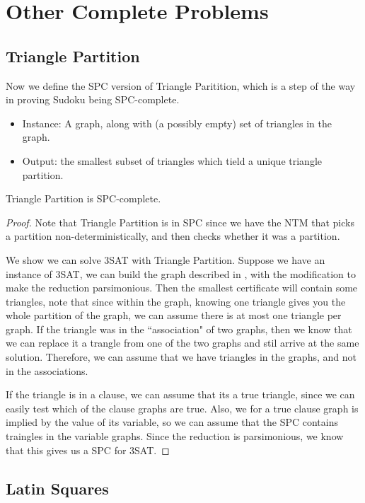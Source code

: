 \documentclass[runningheads,a4paper]{llncs}
\begin{document}
\section{Other Complete Problems}

\subsection{Triangle Partition}

Now we define the SPC version of Triangle Paritition, which is a step of the way in proving Sudoku being SPC-complete. 
\begin{itemize}
\item Instance: A graph, along with (a possibly empty) set of triangles in the graph.
\item Output: the smallest subset of triangles which tield a unique triangle partition.
\end{itemize}

\begin{theorem}
Triangle Partition is SPC-complete.
\end{theorem}

\begin{proof}
Note that Triangle Partition is in SPC since we have the NTM that picks a partition non-deterministically, and then checks whether it was a partition. 

We show we can solve 3SAT with Triangle Partition. Suppose we have an instance of 3SAT, we can build the graph described in \cite{holyer1981np}, with the modification to make the reduction parsimonious. Then the smallest certificate will contain some triangles, note that since within the graph, knowing one triangle gives you the whole partition of the graph, we can assume there is at most one triangle per graph. If the triangle was in the ``association" of two graphs, then we know that we can replace it a trangle from one of the two graphs and stil arrive at the same solution. Therefore, we can assume that we have triangles in the graphs, and not in the associations. 

If the triangle is in a clause, we can assume that its a true triangle, since we can easily test which of the clause graphs are true. Also, we for a true clause graph is implied by the value of its variable, so we can assume that the SPC contains traingles in the variable graphs. Since the reduction is parsimonious, we know that this gives us a SPC for 3SAT. 
\end{proof}

\subsection{Latin Squares}

\begin{theorem}

\end{theorem}



\end{document}
